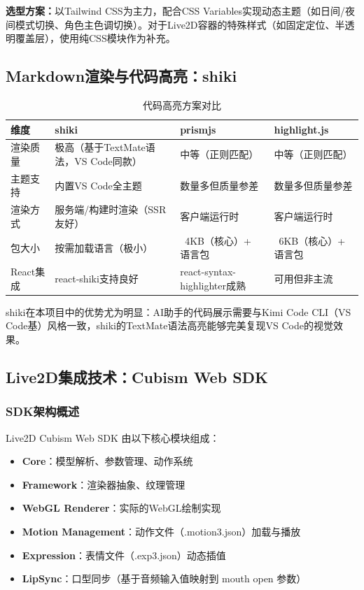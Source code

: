 \documentclass[fontset=mac,a4paper,11pt]{ctexart}
\begin{document}
\textbf{选型方案：}以Tailwind CSS为主力，配合CSS Variables实现动态主题（如日间/夜间模式切换、角色主色调切换）。对于Live2D容器的特殊样式（如固定定位、半透明覆盖层），使用纯CSS模块作为补充。

\subsection{Markdown渲染与代码高亮：shiki}

\begin{table}[H]
\centering
\caption{代码高亮方案对比}
\label{tab:code-highlight}
\begin{tabular}{L{2.5cm}L{3.5cm}L{3.5cm}L{3.5cm}}
\toprule
\textbf{维度} & \textbf{shiki} & \textbf{prismjs} & \textbf{highlight.js} \\
\midrule
{}
渲染质量 & 极高（基于TextMate语法，VS Code同款） & 中等（正则匹配） & 中等（正则匹配） \\
主题支持 & 内置VS Code全主题 & 数量多但质量参差 & 数量多但质量参差 \\
渲染方式 & 服务端/构建时渲染（SSR友好） & 客户端运行时 & 客户端运行时 \\
包大小 & 按需加载语言（极小） & ~4KB（核心）+ 语言包 & ~6KB（核心）+ 语言包 \\
React集成 & react-shiki支持良好 & react-syntax-highlighter成熟 & 可用但非主流 \\
\bottomrule
\end{tabular}
\end{table}

shiki在本项目中的优势尤为明显：AI助手的代码展示需要与Kimi Code CLI（VS Code基）风格一致，shiki的TextMate语法高亮能够完美复现VS Code的视觉效果。

\subsection{Live2D集成技术：Cubism Web SDK}

\subsubsection{SDK架构概述}

Live2D Cubism Web SDK 由以下核心模块组成：

\begin{itemize}[leftmargin=2em]
\item \textbf{Core}：模型解析、参数管理、动作系统
\item \textbf{Framework}：渲染器抽象、纹理管理
\item \textbf{WebGL Renderer}：实际的WebGL绘制实现
\item \textbf{Motion Management}：动作文件（.motion3.json）加载与播放
\item \textbf{Expression}：表情文件（.exp3.json）动态插值
\item \textbf{LipSync}：口型同步（基于音频输入值映射到 mouth open 参数）
\end{itemize}
\end{document}
